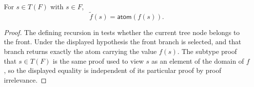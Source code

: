 \begin{lemma}
For $s\in T(F)$ with $s\in F$,
\[
  \widetilde f(s)=\mathsf{atom}(f(s)).
\]
\end{lemma}
\begin{proof}
The defining recursion in  tests whether the current tree
node belongs to the front.  Under the displayed hypothesis the front branch
is selected, and that branch returns exactly the atom carrying the value
$f(s)$.  The subtype proof that $s\in T(F)$ is the same proof used to view
$s$ as an element of the domain of $f$, so the displayed equality is
independent of its particular proof by proof irrelevance.
\end{proof}
